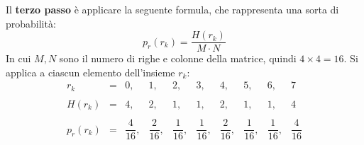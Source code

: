 \documentclass[a4paper]{article}
\begin{document}
	\noindent
	Il \textbf{terzo passo} è applicare la seguente formula, che rappresenta una sorta di probabilità:
	\begin{equation*}
		p_{r}\left(r_{k}\right) = \dfrac{H\left(r_{k}\right)}{M \cdot N}
	\end{equation*}
	In cui $M,N$ sono il numero di righe e colonne della matrice, quindi $4 \times 4 = 16$. Si applica a ciascun elemento dell'insieme $r_{k}$:
	\begin{equation*}
		\begin{array}{rccccccccc}
			r_{k} 					& = & 0,& 1,& 2,& 3,& 4,& 5,& 6,& 7 \\
			\\
			H\left(r_{k}\right) 	& = & 4,& 2,& 1,& 1,& 2,& 1,& 1,& 4 \\
			\\
			p_{r}\left(r_{k}\right) & = & \dfrac{4}{16},& \dfrac{2}{16},& \dfrac{1}{16},& \dfrac{1}{16},& \dfrac{2}{16},& \dfrac{1}{16},& \dfrac{1}{16},& \dfrac{4}{16}
		\end{array}
	\end{equation*}\newpage
\end{document}
